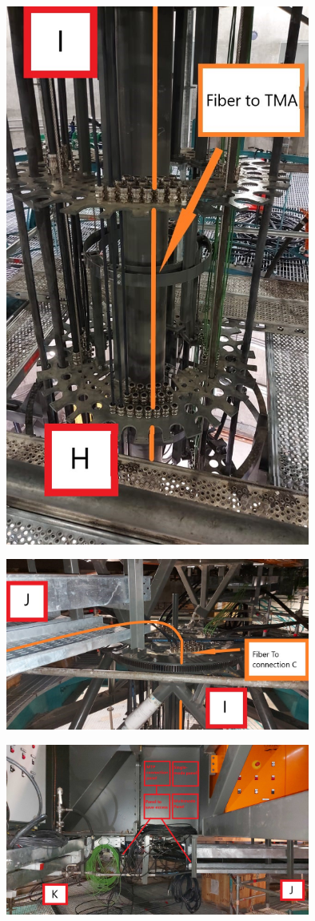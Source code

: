 \begin{figure}
  \centering
  \includegraphics[width=10cm]{images/22-1.jpg}
\end{figure}

\begin{figure}
  \centering
  \includegraphics[width=10cm]{images/23.jpg}
\end{figure}

\begin{figure}
  \centering
  \includegraphics[width=10cm]{images/24.jpg}
\end{figure}

